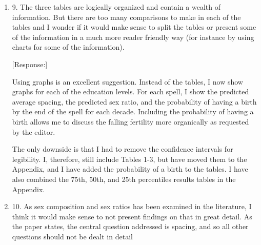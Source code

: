 \documentclass[letterpaper,12pt]{article}
\begin{document}
\begin{enumerate}
[Response:]
I agree completely that the regional differences in fertility, son preference, and use 
of sex selection are important.
To try to capture these differences, I have divided India into four broad regions 
depending on degree of son preference and initial fertility level as in 
\citet{retherford03b}, although expanded to include all states in the surveys.
In addition to the power problem, some education/region/spell/period combinations have too 
small sample sizes for the estimations to converge.
The lack of convergence is especially an issue for the middle-education group at the
higher spells.
I, therefore, first present the all-India results and then focus on regional differences
for only the most educated women, who are the main users of sex selection.

[Part of the reason is the very low fertility in the southern areas. See Guilmoto
and Rajan 2001 and IIPS 2006 and check latest NFHS report on, for example, Tamil Nadu.
TFR of less than 2 is likely.]

It is also worthwhile to note that even some of the southern states appear to have
seen an increase in son preference over time, or, rather, daughter aversion
\citep{DiamondSmith2008}.



\item 9. The three tables are logically organized and contain a wealth of
information. But there are too many comparisons to make in each of the
tables and I wonder if it would make sense to split the tables or
present some of the information in a much more reader friendly way (for
instance by using charts for some of the information). 

[Response:]

Using graphs is an excellent suggestion.
Instead of the tables, I now show graphs for each of the education levels.
For each spell, I show the predicted average spacing, the predicted sex ratio, and the 
probability of having a birth by the end of the spell for each decade.
Including the probability of having a birth allows me to discuss the falling fertility 
more organically as requested by the editor.

The only downside is that I had to remove the confidence intervals for legibility. 
I, therefore, still include Tables 1-3, but have moved them to the Appendix, and I have 
added the probability of a birth to the tables.
I have also combined the 75th, 50th, and 25th percentiles results tables in the Appendix.

\item 10. As sex composition and sex ratios has been examined in the literature, I think
it would make sense to not present findings on that in great detail. As
the paper states, the central question addressed is spacing, and so all
other questions should not be dealt in detail


\end{enumerate}
\end{document}
